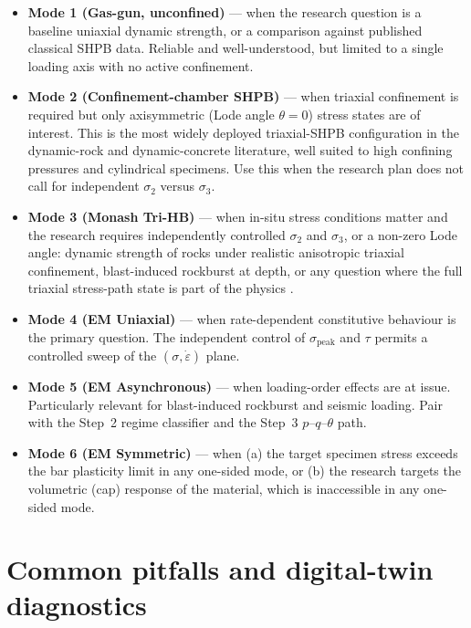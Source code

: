 \documentclass[11pt,a4paper,openany]{book}
\theoremstyle{handbook}
\newcommand{\sig}{\sigma}
\newcommand{\eps}{\varepsilon}
\newcommand{\epsdot}{\dot\eps}
\newcommand{\sigpeak}{\sig_{\text{peak}}}
\begin{document}
\begin{itemize}[leftmargin=*,itemsep=3pt]
  \item \textbf{Mode 1 (Gas-gun, unconfined)} --- when the research question
        is a baseline uniaxial dynamic strength, or a comparison against
        published classical SHPB data. Reliable and well-understood, but
        limited to a single loading axis with no active confinement.
  \item \textbf{Mode 2 (Confinement-chamber SHPB)} --- when triaxial
        confinement is required but only axisymmetric (Lode angle
        $\theta=0$) stress states are of interest. This is the most
        widely deployed triaxial-SHPB configuration in the dynamic-rock
        and dynamic-concrete literature, well suited to high confining
        pressures and cylindrical specimens. Use this when the research
        plan does not call for independent $\sig_2$ versus $\sig_3$.
  \item \textbf{Mode 3 (Monash Tri-HB)} --- when in-situ stress conditions
        matter and the research requires independently controlled $\sig_2$
        and $\sig_3$, or a non-zero Lode angle: dynamic strength of rocks
        under realistic anisotropic triaxial confinement, blast-induced
        rockburst at depth, or any question where the full triaxial
        stress-path state is part of the physics
        \cite{Liu2019,Zhang2019Tri}.
  \item \textbf{Mode 4 (EM Uniaxial)} --- when rate-dependent constitutive
        behaviour is the primary question. The independent control of
        $\sigpeak$ and $\tau$ permits a controlled sweep of the
        $(\sig,\epsdot)$ plane.
  \item \textbf{Mode 5 (EM Asynchronous)} --- when loading-order effects
        are at issue. Particularly relevant for blast-induced rockburst
        and seismic loading. Pair with the Step~2 regime classifier and
        the Step~3 $p$--$q$--$\theta$ path.
  \item \textbf{Mode 6 (EM Symmetric)} --- when (a) the target specimen
        stress exceeds the bar plasticity limit in any one-sided mode, or
        (b) the research targets the volumetric (cap) response of the
        material, which is inaccessible in any one-sided mode.
\end{itemize}

\section{Common pitfalls and digital-twin diagnostics}
\end{document}
